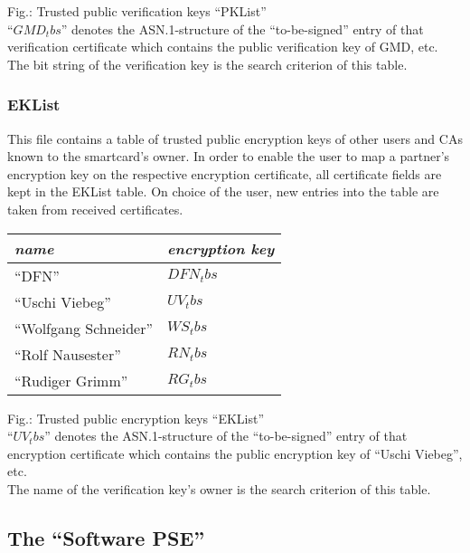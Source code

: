 \label{fig-pklist}
{\footnotesize Fig.: Trusted public verification keys
``PKList''}
\\
{\footnotesize
``$GMD_tbs$'' denotes the ASN.1-structure of the ``to-be-signed'' entry
of that verification certificate
which contains the public verification key of GMD, etc.}
\\[1em]
The bit string of the verification key is the search criterion of this table.

\subsubsection{EKList}
\label{eklist}

This file contains a table of trusted public encryption keys of other
users and CAs known to the smartcard's owner.
In order to enable the user to map a partner's encryption key
on the respective encryption certificate,
all certificate fields are kept in the EKList table.
On choice of the user,
new entries into the table are taken from received certificates.

\begin {center}
\begin {tabular}{|l|l|}
\hline
{\em name} & {\em encryption key} \\
\hline
``DFN''                & $DFN_tbs$     \\ \hline
``Uschi Viebeg''       & $UV_tbs$      \\ \hline
``Wolfgang Schneider'' & $WS_tbs$      \\ \hline
``Rolf Nausester''     & $RN_tbs$      \\ \hline
``Rudiger Grimm''      & $RG_tbs$      \\ \hline
\end {tabular}
\end {center}
 
\label{fig-eklist}
{\footnotesize Fig.: Trusted public encryption keys ``EKList''}
\\
{\footnotesize
``$UV_tbs$'' denotes the ASN.1-structure of the ``to-be-signed'' entry
of that encryption certificate 
which contains the public encryption key of ``Uschi Viebeg'', etc.}
\\[1em]
The name of the verification key's owner
is the search criterion of this table.

\subsection{The ``Software PSE''}
\label{sc-swc}

